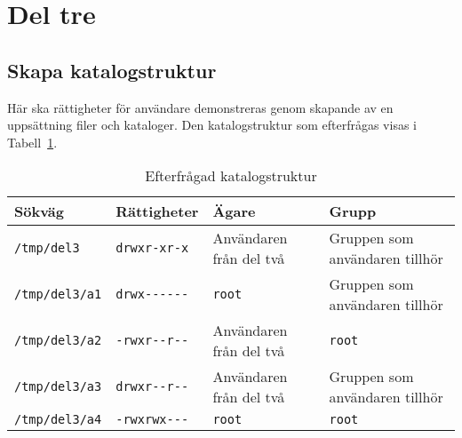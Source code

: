 %
%
%


\section{Del tre}


\subsection{Skapa katalogstruktur}
Här ska rättigheter för användare demonstreras genom skapande av en uppsättning filer
och kataloger. Den katalogstruktur som efterfrågas visas i Tabell~\ref{table:tree}.

\begin{table}[]
  \centering
  \caption{Efterfrågad katalogstruktur}
  \label{table:tree}
  \begin{tabular}{@{}llll@{}}
    \toprule
            Sökväg         & Rättigheter                   & Ägare                     & Grupp               \\ \midrule
    \texttt{/tmp/del3}     & \texttt{drwxr-xr-x}           & Användaren från del två   & Gruppen som användaren tillhör \\
    \texttt{/tmp/del3/a1}  & \texttt{drwx-{}-{}-{}-{}-{}-} & \texttt{root}             & Gruppen som användaren tillhör \\
    \texttt{/tmp/del3/a2}  & \texttt{-rwxr-{}-r-{}-}       &  Användaren från del två  & \texttt{root}                  \\
    \texttt{/tmp/del3/a3}  & \texttt{drwxr-{}-r-{}-}       &  Användaren från del två  & Gruppen som användaren tillhör \\
    \texttt{/tmp/del3/a4}  & \texttt{-rwxrwx-{}-{}-}       & \texttt{root}             & \texttt{root}                  \\\bottomrule
  \end{tabular}
\end{table}


